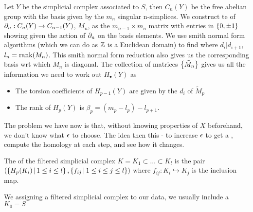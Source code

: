 \documentclass{article}
\begin{document}
Let $Y$ be the simplicial complex associated to $S$, then $C_n(Y)$ be the free abelian group with the basis given by the $m_n$ singular n-simplices. We construct te  of $\partial_n : C_n(Y) \to C_{n-1}(Y)$, $M_n$, as the $m_{n-1} \times m_n$ matrix with entries in $\left\{ 0,\pm1 \right\}$ showing given the action of $\partial_n$ on the basis elements. We use smith normal form algorithms (which we can do as $\mathbb{Z}$ is a Euclidean domain) to find 
where $d_{i} | d_{i+1} $, $l_n = \operatorname{rank}(M_n)$. This smith normal form reduction also gives us the corresponding basis wrt which $M_n$ is diagonal. The collection of matrices $\left\{ \tilde{M}_n \right\}$ gives us all the information we need to work out $H_\bullet(Y)$ as 
\begin{itemize}
	\item The torsion coefficients of $H_{p-1}(Y)$ are given by the $d_i$ of $\tilde{M}_p$
	\item The rank of $H_p(Y)$ is $\beta_p = (m_p - l_p) - l_{p+1}$.
\end{itemize} 

\vspace{3mm} 
 
 The problem we have now is that, without knowing properties of $X$ beforehand, we don't know what $\epsilon$ to choose. The idea then this - to increase $\epsilon$ to get a , compute the homology at each step, and see how it changes. 

\begin{definition}
	The  of the filtered simplicial complex $K = K_1 \subset \dots \subset K_l$ is the pair $\left( \left\{ H_p(K_i) \, | \, 1 \leq i \leq l \right\}, \left\{ f_{ij} \, | \, 1 \leq i \leq j \leq l \right\} \right)$ where $f_{ij} : K_i \hookrightarrow K_j$ is the inclusion map.  
\end{definition}

\begin{remark}
	We assigning a filtered simplicial complex to our data, we usually include a $K_0 = S$
\end{remark}
\end{document}
